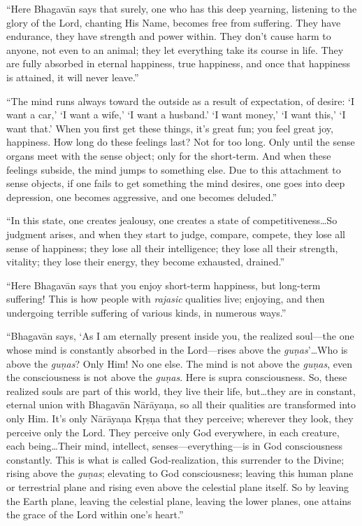 \documentclass[12pt, twoside, openright]{memoir}
\begin{document}
\enquote{Here Bhagavān says that surely, one who has this deep yearning, listening to the glory of the Lord, chanting His Name, becomes free from suffering. They have endurance, they have strength and power within. They don’t cause harm to anyone, not even to an animal; they let everything take its course in life. They are fully absorbed in eternal happiness, true happiness, and once that happiness is attained, it will never leave.}

\enquote{The mind runs always toward the outside as a result of expectation, of desire: \enquote{I want a car,} \enquote{I want a wife,} \enquote{I want a husband.} \enquote{I want money,} \enquote{I want this,} \enquote{I want that.} When you first get these things, it’s great fun; you feel great joy, happiness. How long do these feelings last? Not for too long. Only until the sense organs meet with the sense object; only for the short-term. And when these feelings subside, the mind jumps to something else. Due to this attachment to sense objects, if one fails to get something the mind desires, one goes into deep depression, one becomes aggressive, and one becomes deluded.}

\enquote{In this state, one creates jealousy, one creates a state of competitiveness\ldots So judgment arises, and when they start to judge, compare, compete, they lose all sense of happiness; they lose all their intelligence; they lose all their strength, vitality; they lose their energy, they become exhausted, drained.}

\enquote{Here Bhagavān says that you enjoy short-term happiness, but long-term suffering! This is how people with \textit{rajasic} qualities live; enjoying, and then undergoing terrible suffering of various kinds, in numerous ways.}

\enquote{Bhagavān says, \enquote{As I am eternally present inside you, the realized soul---the one whose mind is constantly absorbed in the Lord---rises above the \textit{guṇas}}\ldots Who is above the \textit{guṇas}? Only Him! No one else. The mind is not above the \textit{guṇas}, even the consciousness is not above the \textit{guṇas}. Here is supra consciousness. So, these realized souls are part of this world, they live their life, but\ldots they are in constant, eternal union with Bhagavān Nārāyaṇa, so all their qualities are transformed into only Him. It’s only Nārāyaṇa Kṛṣṇa that they perceive; wherever they look, they perceive only the Lord. They perceive only God everywhere, in each creature, each being\ldots Their mind, intellect, senses---everything---is in God consciousness constantly. This is what is called God-realization, this surrender to the Divine; rising above the \textit{guṇas}; elevating to God consciousness; leaving this human plane or terrestrial plane and rising even above the celestial plane itself. So by leaving the Earth plane, leaving the celestial plane, leaving the lower planes, one attains the grace of the Lord within one’s heart.}
\end{document}
